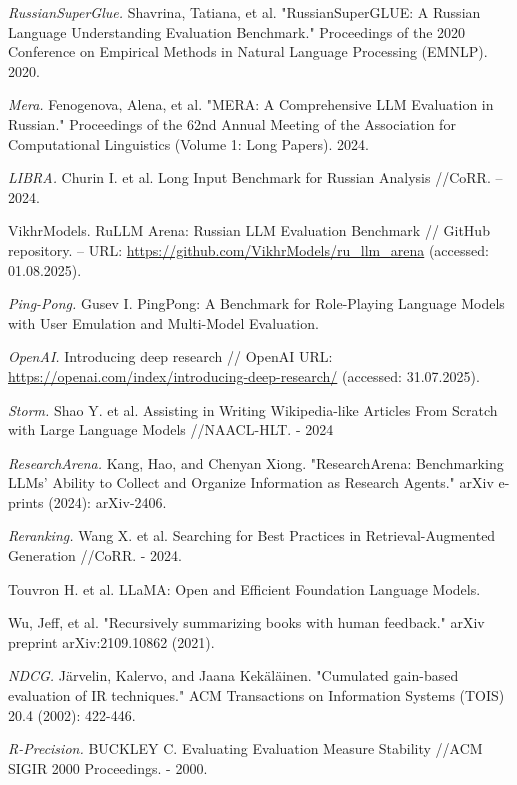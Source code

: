 \documentclass{superfri}
\begin{document}

\begin{thebibliography}{99}

\textit{RussianSuperGlue.}
Shavrina, Tatiana, et al. "RussianSuperGLUE: A Russian Language Understanding Evaluation Benchmark." Proceedings of the 2020 Conference on Empirical Methods in Natural Language Processing (EMNLP). 2020.

\textit{Mera.}
Fenogenova, Alena, et al. "MERA: A Comprehensive LLM Evaluation in Russian." Proceedings of the 62nd Annual Meeting of the Association for Computational Linguistics (Volume 1: Long Papers). 2024.

\textit{LIBRA.}
Churin I. et al. Long Input Benchmark for Russian Analysis //CoRR. – 2024.

VikhrModels. RuLLM Arena: Russian LLM Evaluation Benchmark // GitHub repository. – URL: \url{https://github.com/VikhrModels/ru_llm_arena} (accessed: 01.08.2025).

\textit{Ping-Pong.}
Gusev I. PingPong: A Benchmark for Role-Playing Language Models with User Emulation and Multi-Model Evaluation.

\textit{OpenAI.}
Introducing deep research // OpenAI URL: \url{https://openai.com/index/introducing-deep-research/} (accessed: 31.07.2025).

\textit{Storm.}
Shao Y. et al. Assisting in Writing Wikipedia-like Articles From Scratch with Large Language Models //NAACL-HLT. - 2024

\textit{ResearchArena.}
Kang, Hao, and Chenyan Xiong. "ResearchArena: Benchmarking LLMs' Ability to Collect and Organize Information as Research Agents." arXiv e-prints (2024): arXiv-2406.

\textit{Reranking.}
Wang X. et al. Searching for Best Practices in Retrieval-Augmented Generation //CoRR. - 2024.

Touvron H. et al. LLaMA: Open and Efficient Foundation Language Models.

Wu, Jeff, et al. "Recursively summarizing books with human feedback." arXiv preprint arXiv:2109.10862 (2021).

\textit{NDCG.}
Järvelin, Kalervo, and Jaana Kekäläinen. "Cumulated gain-based evaluation of IR techniques." ACM Transactions on Information Systems (TOIS) 20.4 (2002): 422-446.

\textit{R-Precision.}
BUCKLEY C. Evaluating Evaluation Measure Stability //ACM SIGIR 2000 Proceedings. - 2000.


\end{thebibliography}
\end{document}
